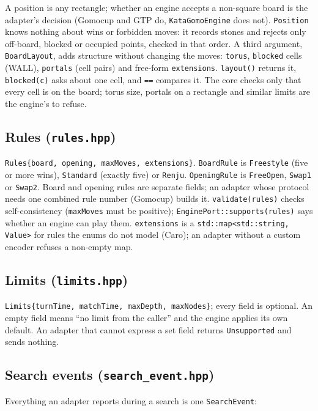 \documentclass[11pt,a4paper]{article}
\newcommand{\code}[1]{\texttt{#1}}
\newcommand{\file}[1]{\texttt{#1}}
\begin{document}
\noindent A position is any rectangle; whether an engine accepts a non-square board is the
adapter's decision (Gomocup and GTP do, \code{KataGomoEngine} does not). \code{Position} knows
nothing about wins or forbidden moves: it records stones and rejects only off-board, blocked or
occupied points, checked in that order. A third argument, \code{BoardLayout}, adds structure
without changing the moves: \code{torus}, \code{blocked} cells (WALL), \code{portals} (cell
pairs) and free-form \code{extensions}. \code{layout()} returns it, \code{blocked(c)} asks about
one cell, and \code{==} compares it. The core checks only that every cell is on the board; torus
size, portals on a rectangle and similar limits are the engine's to refuse.

\subsection{Rules (\file{rules.hpp})}

\code{Rules\{board, opening, maxMoves, extensions\}}. \code{BoardRule} is \code{Freestyle} (five or more wins),
\code{Standard} (exactly five) or \code{Renju}. \code{OpeningRule} is \code{FreeOpen},
\code{Swap1} or \code{Swap2}. Board and opening rules are separate fields; an adapter whose
protocol needs one combined rule number (Gomocup) builds it. \code{validate(rules)} checks
self-consistency
(\code{maxMoves} must be positive); \code{EnginePort::supports(rules)} says whether an engine can play
them. \code{extensions} is a \code{std::map<std::string, Value>} for rules the enums do not model
(Caro); an adapter without a custom encoder refuses a non-empty map.

\subsection{Limits (\file{limits.hpp})}

\code{Limits\{turnTime, matchTime, maxDepth, maxNodes\}}; every field is optional. An empty field
means ``no limit from the caller'' and the engine applies its own default. An adapter that cannot
express a set field returns \code{Unsupported} and sends nothing.

\subsection{Search events (\file{search\_event.hpp})}

Everything an adapter reports during a search is one \code{SearchEvent}:
\end{document}
